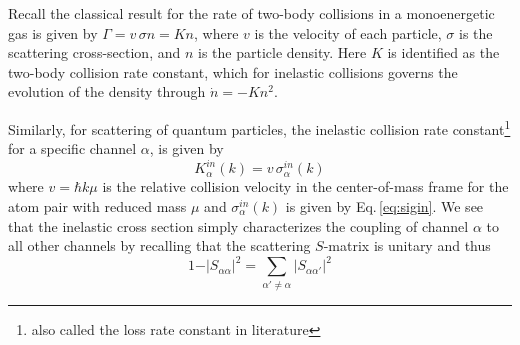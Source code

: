 Recall the classical result for the rate of two-body collisions in a monoenergetic gas is given by $\Gamma = v \,\sigma n = K n$, where $v$ is the velocity of each particle, $\sigma$ is the scattering cross-section, and $n$ is the particle density.
Here $K$ is identified as the two-body collision rate constant, which for inelastic collisions governs the evolution of the density through $\dot{n} = -K n^2$.

Similarly, for scattering of quantum particles, the inelastic collision rate constant\footnote{also called the loss rate constant in literature} for a specific channel $\alpha$, is given by \cite{Nicholson2015a}
\begin{equation} \label{eq:simpleK}
	K^{in}_{\alpha}(k) = v\,\sigma^{in}_{\alpha}(k)
\end{equation}
where $v=\hbar k \mu$ is the relative collision velocity in the center-of-mass frame for the atom pair with reduced mass $\mu$ and $\sigma^{in}_{\alpha}(k)$ is given by Eq.\,\ref{eq:sigin}.
We see that the inelastic cross section simply characterizes the coupling of channel $\alpha$ to all other channels by recalling that the scattering $S$-matrix is unitary and thus
\begin{equation}
	1 - \vert S_{\alpha \alpha} \vert^2 = \sum_{\alpha' \neq \alpha}\vert S_{\alpha \alpha'} \vert^2
\end{equation}

